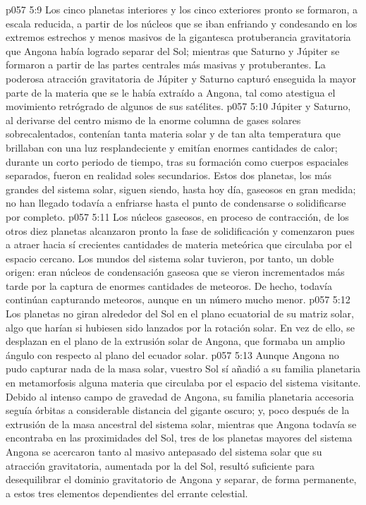 \vs p057 5:9 Los cinco planetas interiores y los cinco exteriores pronto se formaron, a escala reducida, a partir de los núcleos que se iban enfriando y condesando en los extremos estrechos y menos masivos de la gigantesca protuberancia gravitatoria que Angona había logrado separar del Sol; mientras que Saturno y Júpiter se formaron a partir de las partes centrales más masivas y protuberantes. La poderosa atracción gravitatoria de Júpiter y Saturno capturó enseguida la mayor parte de la materia que se le había extraído a Angona, tal como atestigua el movimiento retrógrado de algunos de sus satélites.
\vs p057 5:10 Júpiter y Saturno, al derivarse del centro mismo de la enorme columna de gases solares sobrecalentados, contenían tanta materia solar y de tan alta temperatura que brillaban con una luz resplandeciente y emitían enormes cantidades de calor; durante un corto periodo de tiempo, tras su formación como cuerpos espaciales separados, fueron en realidad soles secundarios. Estos dos planetas, los más grandes del sistema solar, siguen siendo, hasta hoy día, gaseosos en gran medida; no han llegado todavía a enfriarse hasta el punto de condensarse o solidificarse por completo.
\vs p057 5:11 Los núcleos gaseosos, en proceso de contracción, de los otros diez planetas alcanzaron pronto la fase de solidificación y comenzaron pues a atraer hacia sí crecientes cantidades de materia meteórica que circulaba por el espacio cercano. Los mundos del sistema solar tuvieron, por tanto, un doble origen: eran núcleos de condensación gaseosa que se vieron incrementados más tarde por la captura de enormes cantidades de meteoros. De hecho, todavía continúan capturando meteoros, aunque en un número mucho menor.
\vs p057 5:12 Los planetas no giran alrededor del Sol en el plano ecuatorial de su matriz solar, algo que harían si hubiesen sido lanzados por la rotación solar. En vez de ello, se desplazan en el plano de la extrusión solar de Angona, que formaba un amplio ángulo con respecto al plano del ecuador solar.
\vs p057 5:13 \pc Aunque Angona no pudo capturar nada de la masa solar, vuestro Sol sí añadió a su familia planetaria en metamorfosis alguna materia que circulaba por el espacio del sistema visitante. Debido al intenso campo de gravedad de Angona, su familia planetaria accesoria seguía órbitas a considerable distancia del gigante oscuro; y, poco después de la extrusión de la masa ancestral del sistema solar, mientras que Angona todavía se encontraba en las proximidades del Sol, tres de los planetas mayores del sistema Angona se acercaron tanto al masivo antepasado del sistema solar que su atracción gravitatoria, aumentada por la del Sol, resultó suficiente para desequilibrar el dominio gravitatorio de Angona y separar, de forma permanente, a estos tres elementos dependientes del errante celestial.
